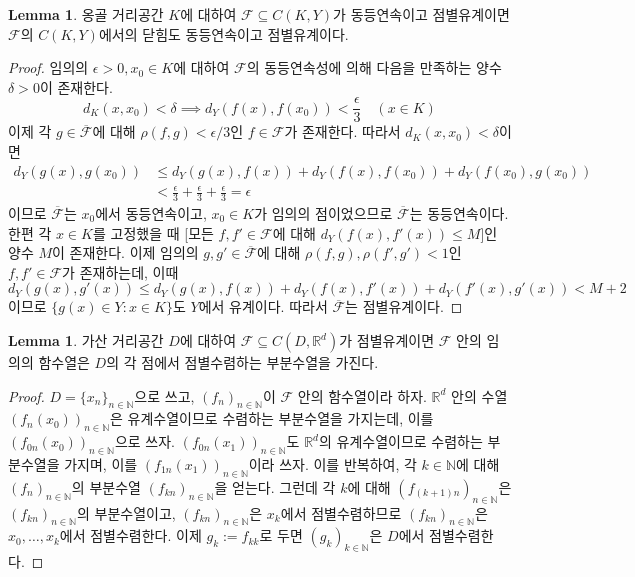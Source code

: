 \documentclass[11pt]{book}
\numberwithin{equation}{chapter}
\def\NN{\mathbb{N}}
\def\RR{\mathbb{R}}
\def\eps{\epsilon}
\def\calF{\mathcal{F}}
\theoremstyle{definition}
\newtheorem{lem}[thm]{Lemma}
\begin{document}
\begin{lem} \label{10.2.8}
    옹골 거리공간 \(K\)에 대하여 \(\calF \subseteq C(K, Y)\)가 동등연속이고 점별유계이면 \(\calF\)의 \(C(K, Y)\)에서의 닫힘도 동등연속이고 점별유계이다.
\end{lem}
\begin{proof}
    임의의 \(\eps >0 , x_0 \in K\)에 대하여 \(\calF\)의 동등연속성에 의해 다음을 만족하는 양수 \(\delta > 0\)이 존재한다.
    \[
    d_K(x, x_0) < \delta \implies d_Y(f(x), f(x_0)) < \frac{\eps}{3}    \quad (x \in K)
    \]
    이제 각 \(g \in \overline{\calF}\)에 대해 \(\rho(f, g) < \eps/3\)인 \(f \in \calF\)가 존재한다. 따라서 \(d_K(x, x_0 ) < \delta \)이면
    \begin{align*}
        d_Y(g(x), g(x_0)) &\le d_Y(g(x), f(x)) + d_Y(f(x), f(x_0)) + d_Y(f(x_0), g(x_0))\\
        &< \frac{\eps}{3} + \frac{\eps}{3} + \frac{\eps}{3} = \eps
    \end{align*}
    이므로 \(\overline{\calF}\)는 \(x_0\)에서 동등연속이고, \(x_0 \in K\)가 임의의 점이었으므로 \(\overline{\calF}\)는 동등연속이다.\\
    한편 각 \(x \in K\)를 고정했을 때 [모든 \(f, f' \in \calF\)에 대해 \(d_Y(f(x), f'(x)) \le M\)]인 양수 \(M\)이 존재한다. 이제 임의의 \(g, g' \in \overline{\calF}\)에 대해 \(\rho(f, g), \rho(f', g') < 1\)인 \(f, f' \in \calF\)가 존재하는데, 이때
    \[
    d_Y(g(x), g'(x)) \le d_Y(g(x), f(x)) + d_Y(f(x), f'(x)) + d_Y(f'(x), g'(x)) < M+2    
    \]
    이므로 \(\{g(x) \in Y : x \in K\}\)도 \(Y\)에서 유계이다. 따라서 \(\overline{\calF}\)는 점별유계이다.
\end{proof}

\begin{lem} \label{10.2.9}
    가산 거리공간 \(D\)에 대하여 \(\calF \subseteq C(D, \RR^d)\)가 점별유계이면 \(\calF\) 안의 임의의 함수열은 \(D\)의 각 점에서 점별수렴하는 부분수열을 가진다.
\end{lem}
\begin{proof}
    \(D = \{x_n\}_{n \in \NN}\)으로 쓰고, \((f_n)_{n \in \NN}\)이 \(\calF\) 안의 함수열이라 하자. \(\RR^d\) 안의 수열 \((f_n(x_0))_{n \in \NN}\)은 유계수열이므로 수렴하는 부분수열을 가지는데, 이를 \((f_{0n}(x_0))_{n \in \NN}\)으로 쓰자. \((f_{0n}(x_1))_{n \in \NN}\)도 \(\RR^d\)의 유계수열이므로 수렴하는 부분수열을 가지며, 이를 \((f_{1n}(x_1))_{n \in \NN}\)이라 쓰자. 이를 반복하여, 각 \(k \in \NN\)에 대해 \((f_n)_{n \in \NN}\)의 부분수열 \((f_{kn})_{n \in \NN}\)을 얻는다. 그런데 각 \(k\)에 대해 \((f_{(k+1)n})_{n \in \NN}\)은 \((f_{kn})_{n \in \NN}\)의 부분수열이고, \((f_{kn})_{n \in \NN}\)은 \(x_k\)에서 점별수렴하므로 \((f_{kn})_{n \in \NN}\)은 \(x_0, \ldots, x_k\)에서 점별수렴한다. 이제 \(g_k := f_{kk}\)로 두면 \((g_k)_{k \in \NN}\)은 \(D\)에서 점별수렴한다.
\end{proof}
\end{document}
